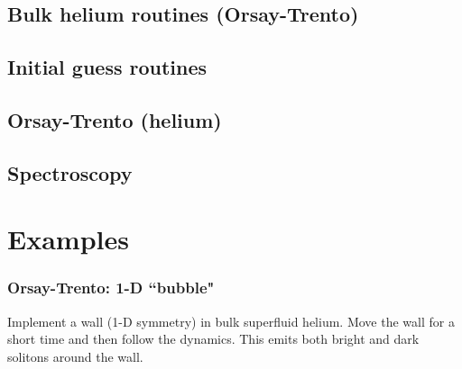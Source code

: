 \documentclass[12pt,letterpaper]{report}
\begin{document}
\section{Bulk helium routines (Orsay-Trento)}



\section{Initial guess routines}



\section{Orsay-Trento (helium)}



\section{Spectroscopy}



\chapter{Examples}

\subsection{Orsay-Trento: 1-D ``bubble"}

Implement a wall (1-D symmetry) in bulk superfluid helium. Move the wall for a short time and then follow the dynamics. This emits both bright and dark solitons around the wall.
\end{document}
